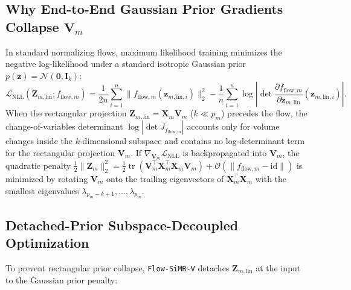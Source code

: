 \documentclass[
  10pt,
  letterpaper,
]{report}
\begin{document}
\subsection{\texorpdfstring{Why End-to-End Gaussian Prior Gradients
Collapse
\(\mathbf{V}_m\)}{Why End-to-End Gaussian Prior Gradients Collapse \textbackslash mathbf\{V\}\_m}}\label{why-end-to-end-gaussian-prior-gradients-collapse-mathbfv_m}

In standard normalizing flows, maximum likelihood training minimizes the
negative log-likelihood under a standard isotropic Gaussian prior
\(p(\mathbf{z}) = \mathcal{N}(\mathbf{0}, \mathbf{I}_k)\): \[
\mathcal{L}_{\text{NLL}}(\mathbf{Z}_{m,\text{lin}}; f_{\text{flow},m}) = \frac{1}{2n}\sum_{i=1}^n \|f_{\text{flow},m}(\mathbf{z}_{m,\text{lin},i})\|_2^2 - \frac{1}{n}\sum_{i=1}^n \log \left|\det \frac{\partial f_{\text{flow},m}}{\partial \mathbf{z}_{m,\text{lin}}}(\mathbf{z}_{m,\text{lin},i})\right|.
\] When the rectangular projection
\(\mathbf{Z}_{m,\text{lin}} = \mathbf{X}_m \mathbf{V}_m\)
(\(k \ll p_m\)) precedes the flow, the change-of-variables determinant
\(\log |\det J_{f_{\text{flow},m}}|\) accounts only for volume changes
inside the \(k\)-dimensional subspace and contains no log-determinant
term for the rectangular projection \(\mathbf{V}_m\). If
\(\nabla_{\mathbf{V}_m} \mathcal{L}_{\text{NLL}}\) is backpropagated
into \(\mathbf{V}_m\), the quadratic penalty
\(\frac{1}{2}\|\mathbf{Z}_m\|_2^2 = \frac{1}{2}\operatorname{tr}(\mathbf{V}_m^\top \mathbf{X}_m^\top \mathbf{X}_m \mathbf{V}_m) + \mathcal{O}(\|f_{\text{flow},m} - \mathrm{id}\|)\)
is minimized by rotating \(\mathbf{V}_m\) onto the trailing eigenvectors
of \(\mathbf{X}_m^\top \mathbf{X}_m\) with the smallest eigenvalues
\(\lambda_{p_m-k+1}, \dots, \lambda_{p_m}\).

\subsection{Detached-Prior Subspace-Decoupled
Optimization}\label{detached-prior-subspace-decoupled-optimization}

To prevent rectangular prior collapse, \texttt{Flow-SiMR-V} detaches
\(\mathbf{Z}_{m,\text{lin}}\) at the input to the Gaussian prior
penalty:
\end{document}
